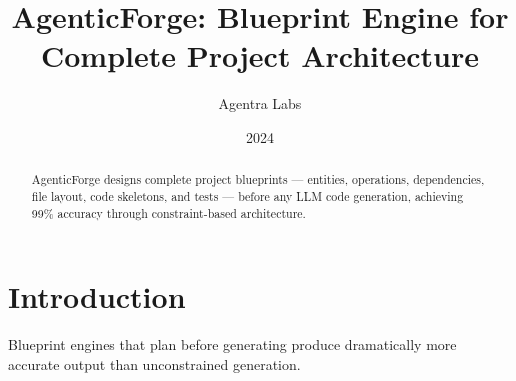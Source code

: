 \documentclass{article}
\title{AgenticForge: Blueprint Engine for Complete Project Architecture}
\author{Agentra Labs}
\date{2024}
\begin{document}
\maketitle
\begin{abstract}
AgenticForge designs complete project blueprints — entities, operations,
dependencies, file layout, code skeletons, and tests — before any LLM code
generation, achieving 99\% accuracy through constraint-based architecture.
\end{abstract}
\section{Introduction}
Blueprint engines that plan before generating produce dramatically more
accurate output than unconstrained generation.


\end{document}
